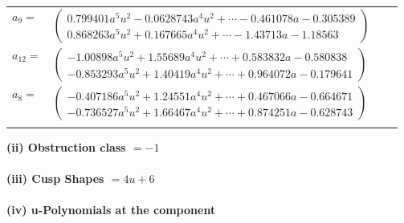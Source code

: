 \documentclass[1p]{elsarticle_modified}
\theoremstyle{definition}
\begin{document}
\begin{tabular}{m{7pt} m{180pt} m{7pt} m{180pt} }
\flushright $a_{9}=$&$\begin{pmatrix}0.799401 a^{5} u^{2}-0.0628743 a^{4} u^{2}+\cdots-0.461078 a-0.305389\\0.868263 a^{5} u^{2}+0.167665 a^{4} u^{2}+\cdots-1.43713 a-1.18563\end{pmatrix}$ \\
\flushright $a_{12}=$&$\begin{pmatrix}-1.00898 a^{5} u^{2}+1.55689 a^{4} u^{2}+\cdots+0.583832 a-0.580838\\-0.853293 a^{5} u^{2}+1.40419 a^{4} u^{2}+\cdots+0.964072 a-0.179641\end{pmatrix}$ \\
\flushright $a_{8}=$&$\begin{pmatrix}-0.407186 a^{5} u^{2}+1.24551 a^{4} u^{2}+\cdots+0.467066 a-0.664671\\-0.736527 a^{5} u^{2}+1.66467 a^{4} u^{2}+\cdots+0.874251 a-0.628743\end{pmatrix}$\\&\end{tabular}
\flushleft \textbf{(ii) Obstruction class $= -1$}\\~\\
\flushleft \textbf{(iii) Cusp Shapes $= 4 u+6$}\\~\\
\newpage\renewcommand{\arraystretch}{1}
\flushleft \textbf{(iv) u-Polynomials at the component}\newline \\
\end{document}
